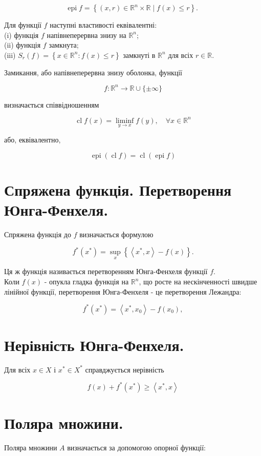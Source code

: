 \documentclass[10pt]{article}
\begin{document}
$$
\operatorname{epi} f=\left\{(x, r) \in \mathbb{R}^{n} \times \mathbb{R} \mid f(x) \leq r\right\} \text {. }
$$

Для функції $f$ наступні властивості еквівалентні:\\
(i) функція $f$ напівнеперервна знизу на $\mathbb{R}^{n}$;\\
(ii) функція $f$ замкнута;\\
(iii) $S_{r}(f)=\left\{x \in \mathbb{R}^{n}: f(x) \leq r\right\}$ замкнуті в $\mathbb{R}^{n}$ для всіх $r \in \mathbb{R}$.

Замикання, або напівнеперервна знизу оболонка, функції

$$
f: \mathbb{R}^{n} \rightarrow \mathbb{R} \cup\{ \pm \infty\}
$$

визначається співвідношенням

$$
\operatorname{cl} f(x)=\liminf _{y \rightarrow x} f(y), \quad \forall x \in \mathbb{R}^{n}
$$

або, еквівалентно,

$$
\operatorname{epi}(\operatorname{cl} f)=\operatorname{cl}(\operatorname{epi} f)
$$

\section*{Спряжена функція. Перетворення Юнга-Фенхеля.}
Спряжена функція до $f$ визначається формулою

$$
f^{*}\left(x^{*}\right)=\sup _{x}\left\{\left\langle x^{*}, x\right\rangle-f(x)\right\} .
$$

Ця ж функція називається перетворенням Юнга-Фенхеля функції $f$.\\
Коли $f(x)$ - опукла гладка функція на $\mathbb{R}^{n}$, що росте на нескінченності швидше лінійної функції, перетворення Юнга-Фенхеля - це перетворення Лежандра:

$$
f^{*}\left(x^{*}\right)=\left\langle x^{*}, x_{0}\right\rangle-f\left(x_{0}\right),
$$

\section*{Нерівність Юнга-Фенхеля.}
Для всіх $x \in X$ і $x^{*} \in X^{*}$ справджується нерівність

$$
f(x)+f^{*}\left(x^{*}\right) \geq\left\langle x^{*}, x\right\rangle
$$

\section*{Поляра множини.}
Поляра множини $A$ визначається за допомогою опорної функції:
\end{document}
